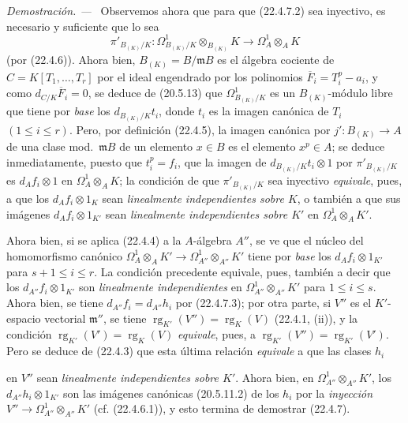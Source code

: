 \documentclass[10pt,oneside]{book}
\newcommand{\oldpage}[2][]{%
  \setcounter{footnote}{0}%
  \marginpar{\scriptsize\textbf{#1}~|~#2}\ignorespaces}
\newenvironment{proof}{%
  \par\medskip\noindent\textit{Demostración. ---\ }}{\par}
\providecommand{\setmin}{-}%
\begin{document}
\begin{proof}
Observemos ahora que para que (22.4.7.2) sea inyectivo, es necesario y suficiente
que lo sea
\[
  \pi'_{B_{(K)}/K}:\Omega^1_{B_{(K)}/K}\otimes_{B_{(K)}}K
  \longrightarrow\Omega^1_A\otimes_AK
\]
(por (22.4.6)). Ahora bien, $B_{(K)}=B/\mathfrak mB$ es el álgebra cociente de
$C=K[T_1,\ldots,T_r]$ por el ideal engendrado por los polinomios
$\overline F_i=T_i^p\setmin a_i$, y como $d_{C/K}\overline F_i=0$, se deduce de
(20.5.13) que $\Omega^1_{B_{(K)}/K}$ es un $B_{(K)}$-módulo libre que tiene por
\emph{base} los $d_{B_{(K)}/K}t_i$, donde $t_i$ es la imagen canónica de $T_i$
$(1\leqslant i\leqslant r)$. Pero, por definición (22.4.5), la imagen canónica por
$j':B_{(K)}\longrightarrow A$ de una clase mod.~$\mathfrak mB$ de un elemento
$x\in B$ es el elemento $x^p\in A$; se deduce inmediatamente, puesto que $t_i^p=f_i$,
que la imagen de $d_{B_{(K)}/K}t_i\otimes1$ por $\pi'_{B_{(K)}/K}$ es
$d_Af_i\otimes1$ en $\Omega^1_A\otimes_AK$; la condición de que
$\pi'_{B_{(K)}/K}$ sea inyectivo \emph{equivale}, pues, a que los
$d_Af_i\otimes1_K$ sean \emph{linealmente independientes sobre $K$}, o también
a que sus imágenes $d_Af_i\otimes1_{K'}$ sean \emph{linealmente independientes
sobre $K'$} en $\Omega^1_A\otimes_AK'$.

Ahora bien, si se aplica (22.4.4) a la $A$-álgebra $A''$, se ve que el núcleo del
homomorfismo canónico
$\Omega^1_A\otimes_AK'\longrightarrow\Omega^1_{A''}\otimes_{A''}K'$ tiene por
\emph{base} los $d_Af_i\otimes1_{K'}$ para $s+1\leqslant i\leqslant r$. La condición
precedente equivale, pues, también a decir que los $d_{A''}f_i\otimes1_{K'}$ son
\emph{linealmente independientes} en $\Omega^1_{A''}\otimes_{A''}K'$ para
$1\leqslant i\leqslant s$. Ahora bien, se tiene $d_{A''}f_i=d_{A''}h_i$ por (22.4.7.3);
por otra parte, si $V''$ es el $K'$-espacio vectorial $\mathfrak m''$, se tiene
$\operatorname{rg}_{K'}(V'')=\operatorname{rg}_K(V)$ (22.4.1, (ii)), y la condición
$\operatorname{rg}_{K'}(V')=\operatorname{rg}_K(V)$ \emph{equivale}, pues, a
$\operatorname{rg}_{K'}(V'')=\operatorname{rg}_{K'}(V')$. Pero se deduce de (22.4.3) que esta última
relación \emph{equivale} a que las clases $h_i$

\oldpage[0\textsubscript{IV-1}]{200}

en $V''$ sean \emph{linealmente independientes sobre $K'$}. Ahora bien, en
$\Omega^1_{A''}\otimes_{A''}K'$, los $d_{A''}h_i\otimes1_{K'}$ son las imágenes
canónicas (20.5.11.2) de los $h_i$ por la \emph{inyección}
$V''\longrightarrow\Omega^1_{A''}\otimes_{A''}K'$ (cf. (22.4.6.1)), y esto
termina de demostrar (22.4.7).
\end{proof}
\end{document}
